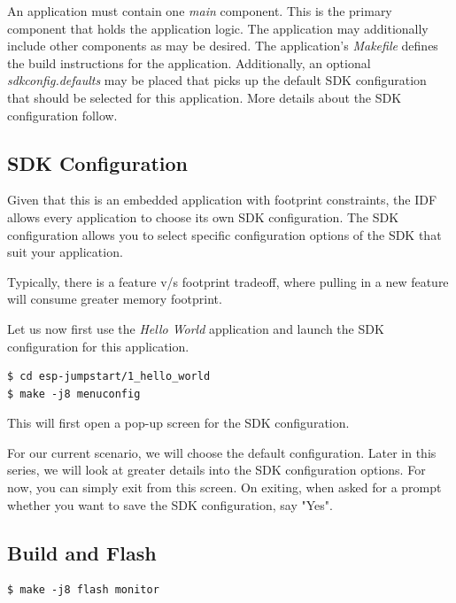 \documentclass[main.tex]{subfiles}
\begin{document}
An application must contain one \textit{main} component. This is the primary component that holds the application logic. The application may additionally include other components as may be desired.
The application's \textit{Makefile} defines the build instructions for the application. 
Additionally, an optional \textit{sdkconfig.defaults} may be placed that picks up the default SDK configuration that should be selected for this application. More details about the SDK configuration follow.

\subsection{SDK Configuration}

Given that this is an embedded application with footprint constraints, the IDF allows every application to choose its own SDK configuration. The SDK configuration allows you to select specific configuration options of the SDK that suit your application.

Typically, there is a feature v/s footprint tradeoff, where pulling in a new feature will consume greater memory footprint.

Let us now first use the \textit{Hello World} application and launch the SDK configuration for this application.

\begin{verbatim}
$ cd esp-jumpstart/1_hello_world
$ make -j8 menuconfig
\end{verbatim}

This will first open a pop-up screen for the SDK configuration.

For our current scenario, we will choose the default configuration. Later in this series, we will look at greater details into the SDK configuration options. For now, you can simply exit from this screen. On exiting, when asked for a prompt whether you want to save the SDK configuration, say "Yes".


\subsection{Build and Flash}
\begin{verbatim}
$ make -j8 flash monitor
\end{verbatim}
\end{document}
